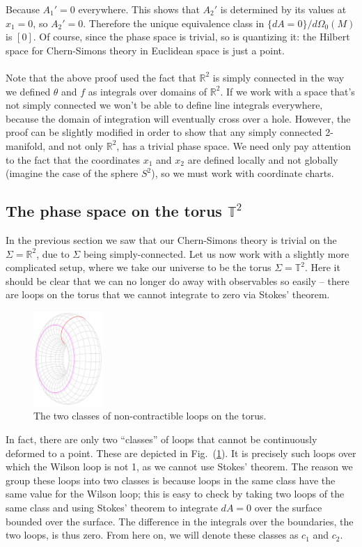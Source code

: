 \documentclass[12pt]{article}
\begin{document}
Because $A_1' = 0$ everywhere. This shows that $A_2'$ is determined by its values at $x_1=0$, so $A_2' = 0$. Therefore the unique equivalence class in $\{dA=0\}/d\Omega_0(M)$ is $[0]$. Of course, since the phase space is trivial, so is quantizing it: the Hilbert space for Chern-Simons theory in Euclidean space is just a point.
\\
\\
Note that the above proof used the fact that $\mathbb{R}^2$ is simply connected in the way we defined $\theta$ and $f$ as integrals over domains of $\mathbb{R}^2$. If we work with a space that's not simply connected we won't be able to define line integrals everywhere, because the domain of integration will eventually cross over a hole. However, the proof can be slightly modified in order to show that any simply connected 2-manifold, and not only $\mathbb{R}^2$, has a trivial phase space. We need only pay attention to the fact that the coordinates $x_1$ and $x_2$ are defined locally and not globally (imagine the case of the sphere $S^2$), so we must work with coordinate charts.





\subsection*{The phase space on the torus $\mathbb{T}^2$}

In the previous section we saw that our Chern-Simons theory is trivial on the $\Sigma=\mathbb{R}^2$, due to $\Sigma$ being simply-connected. Let us now work with a slightly more complicated setup, where we take our universe to be the torus $\Sigma=\mathbb{T}^2$. Here it should be clear that we can no longer do away with observables so easily -- there are loops on the torus that we cannot integrate to zero via Stokes' theorem.
\begin{figure}[h]
\centering
\includegraphics[width=100px]{torus.png}
\caption{The two classes of non-contractible loops on the torus.}
\label{fig:torus}
\end{figure}
In fact, there are only two ``classes'' of loops that cannot be continuously deformed to a point. These are depicted in Fig.~(\ref{fig:torus}). It is precisely such loops over which the Wilson loop is not 1, as we cannot use Stokes' theorem.
The reason we group these loops into two classes is because loops in the same class have the same value for the Wilson loop; this is easy to check by taking two loops of the same class and using Stokes' theorem to integrate $dA=0$ over the surface bounded over the surface. The difference in the integrals over the boundaries, the two loops, is thus zero. From here on, we will denote these classes as $c_1$ and $c_2$.
\end{document}
